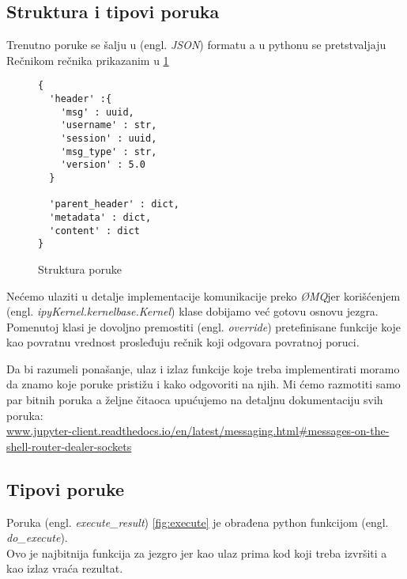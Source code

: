\documentclass[a4paper]{article}
\newcommand{\eng}[1]{(engl. \textit{#1})}
\newcommand{\zMQ}[0]{\textit{ØMQ}}
\begin{document}
{\subsection{Struktura i tipovi poruka}
\label{sec:Pformat}

Trenutno poruke se šalju u \eng{JSON} formatu a u pythonu se pretstvaljaju 
Rečnikom rečnika prikazanim u \ref{fig:struktPoruka} \cite{IPython}

\cite{IPython}

\begin{figure}[h!]
\begin{center}
  \begin{verbatim}
{
  'header' :{
    'msg' : uuid,
    'username' : str,
    'session' : uuid,
    'msg_type' : str,
    'version' : 5.0
  }

  'parent_header' : dict,
  'metadata' : dict,
  'content' : dict
}
\end{verbatim}
\end{center}
\caption{Struktura poruke}
\label{fig:struktPoruka}
\end{figure}

Nećemo ulaziti u detalje implementacije komunikacije preko \zMQ jer korišćenjem
\eng{ipyKernel.kernelbase.Kernel} klase dobijamo već gotovu osnovu jezgra.
Pomenutoj klasi je dovoljno premostiti \eng{override} pretefinisane funkcije
koje kao povratnu vrednost prosleđuju rečnik koji odgovara povratnoj poruci. \cite{Ipython}

Da bi razumeli ponašanje, ulaz i izlaz funkcije koje treba implementirati
moramo da znamo koje poruke pristižu i kako odgovoriti na njih.
Mi ćemo razmotiti samo par bitnih poruka a željne čitaoca upućujemo na 
detaljnu dokumentaciju svih poruka: \\
\url{www.jupyter-client.readthedocs.io/en/latest/messaging.html#messages-on-the-shell-router-dealer-sockets}


\subsection{Tipovi poruke}
\label{sec:PTipPoruke}


Poruka \eng{execute\_result} \ref{fig:execute} je obrađena python funkcijom \eng{do\_execute}. \\
Ovo je najbitnija funkcija za jezgro jer kao ulaz prima kod koji treba izvršiti a kao izlaz vraća rezultat.


\begin{figure}[h!]
\begin{center}


\end{center}
\end{figure}}
\end{document}
